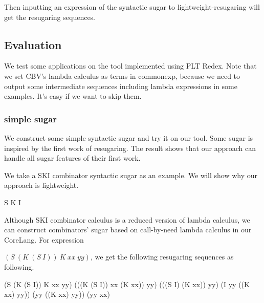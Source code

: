 Then inputting an expression of the syntactic sugar to lightweight-resugaring will get the resugaring sequences.

\subsection{Evaluation}

We test some applications on the tool implemented using PLT Redex. Note that we set CBV's lambda calculus as terms in commonexp, because we need to output some intermediate sequences including lambda expressions in some examples. It's easy if we want to skip them.

\subsubsection{simple sugar}
\label{mark:simple}

We construct some simple syntactic sugar and try it on our tool. Some sugar is inspired by the first work of resugaring\cite{resugaring}. The result shows that our approach can handle all sugar features of their first work.

We take a SKI combinator syntactic sugar as an example. We will show why our approach is lightweight.
\begin{Codes}
	S 
	K 
	I 
\end{Codes}



Although SKI combinator calculus is a reduced version of lambda calculus, we can construct combinators' sugar based on call-by-need lambda calculus in our CoreLang. For expression

 $(S~(K~(S~I))~K~xx~yy)$, we get the following resugaring sequences as following.
\begin{Codes}
    (S (K (S I)) K xx yy)
\CoreStep (((K (S I)) xx (K xx)) yy)
\CoreStep (((S I) (K xx)) yy)
\CoreStep (I yy ((K xx) yy))
\CoreStep (yy ((K xx) yy))
\CoreStep (yy xx)
\end{Codes}

